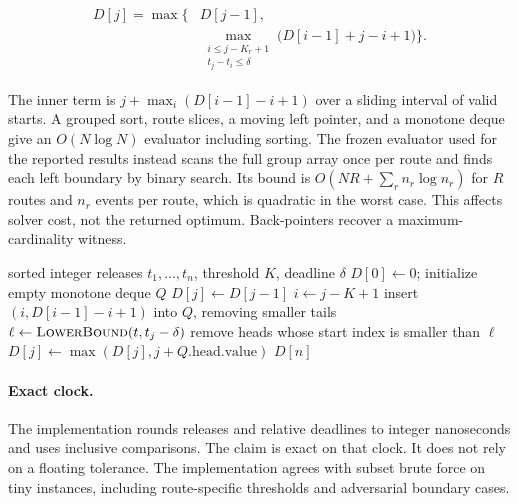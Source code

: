 \begin{equation}
\begin{aligned}
D[j]=\max\biggl\{&D[j-1],\\[-2pt]
 &\max_{\substack{i\leq j-K_r+1\\t_j-t_i\leq\delta}}
 \bigl(D[i-1]+j-i+1\bigr)\biggr\}.
\end{aligned}
\label{eq:dp}
\end{equation}

The inner term is $j+\max_i(D[i-1]-i+1)$ over a sliding interval of valid
starts. A grouped sort, route slices, a moving left pointer, and a monotone
deque give an $O(N\log N)$ evaluator including sorting. The frozen evaluator
used for the reported results instead scans the full group array once per route
and finds each left boundary by binary search. Its bound is
$O(NR+\sum_r n_r\log n_r)$ for $R$ routes and $n_r$ events per route, which is
quadratic in the worst case. This affects solver cost, not the returned optimum.
Back-pointers recover a maximum-cardinality witness.

\begin{algorithm}[t]
  \caption{Equal-relative-deadline packing for one route}
  \label{alg:packing}
  \begin{algorithmic}[1]
    \Require sorted integer releases $t_1,\ldots,t_n$, threshold $K$, deadline $\delta$
    \State $D[0]\gets 0$; initialize empty monotone deque $Q$
      \State $D[j]\gets D[j-1]$
      \State $i\gets j-K+1$
        \State insert $(i,D[i-1]-i+1)$ into $Q$, removing smaller tails
      \EndIf
      \State $\ell\gets\Call{LowerBound}{t,t_j-\delta}$
      \State remove heads whose start index is smaller than $\ell$
        \State $D[j]\gets\max(D[j],j+Q.\mathrm{head.value})$
      \EndIf
    \EndFor
    \State \Return $D[n]$
  \end{algorithmic}
\end{algorithm}

\paragraph{Exact clock.}
The implementation rounds releases and relative deadlines to integer
nanoseconds and uses inclusive comparisons. The claim is exact on that clock.
It does not rely on a floating tolerance. The implementation agrees with
subset brute force on tiny instances, including route-specific thresholds and
adversarial boundary cases.


